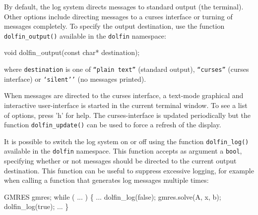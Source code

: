 By default, the \dolfin{} log system directs messages to standard
output (the terminal). Other options include directing messages to a
curses interface or turning of messages completely. To specify the
output destination, use the function \texttt{dolfin\_output()}
available in the \texttt{dolfin} namespace:
\begin{code}
  void dolfin_output(const char* destination);
\end{code}
where \texttt{destination} is one of
\texttt{``plain text''} (standard output),
\texttt{``curses''} (curses interface)
or \texttt{`silent''} (no messages printed).

When messages are directed to the \dolfin{} curses interface, a
text-mode graphical and interactive user-interface is started in the
current terminal window. To see a list of options, press 'h' for
help. The curses-interface is updated periodically but the function
\texttt{dolfin\_update()} can be used to force a refresh of the
display.

It is possible to switch the \dolfin{} log system on or off using the
function \texttt{dolfin\_log()} available in the \texttt{dolfin} namespace.
This function accepts as argument a \texttt{bool}, specifying whether
or not messages should be directed to the current output destination.
This function can be useful to suppress excessive logging, for example
when calling a function that generates log messages multiple times:
\begin{code}
  GMRES gmres;
  while ( ... )
  \{
    ...
    dolfin_log(false);
    gmres.solve(A, x, b);
    dolfin_log(true);
    ...
  \}
\end{code}
